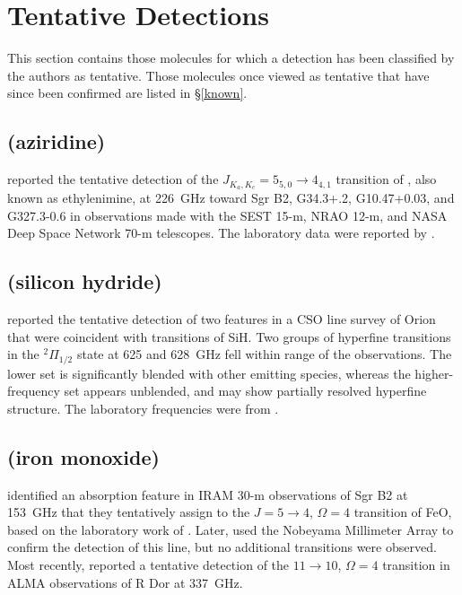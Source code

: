 \documentclass[twocolumn]{aastex631}
\begin{document}

	
\section{Tentative Detections}
\label{tentative}

This section contains those molecules for which a detection has been classified by the authors as tentative.  Those molecules once viewed as tentative that have since been confirmed are listed in \S\ref{known}.

    \subsection{ (aziridine)}
	\label{C2H5N}
	
	\citet{Dickens:2001uc} reported the tentative detection of the $J_{K_a,K_c} = 5_{5,0}\rightarrow4_{4,1}$ transition of , also known as ethylenimine, at 226~GHz toward Sgr B2, G34.3+.2, G10.47+0.03, and G327.3-0.6 in observations made with the SEST 15-m, NRAO 12-m, and NASA Deep Space Network 70-m telescopes.  The laboratory data were reported by \citet{Thorwirth:2000ii}.  
	
	\subsection{ (silicon hydride)}
	\label{SiH}
	
	\citet{Schilke:2001fr} reported the tentative detection of two features in a CSO line survey of Orion that were coincident with transitions of SiH.  Two groups of hyperfine transitions in the $^2\Pi _{1/2}$ state at 625 and 628~GHz fell within range of the observations.  The lower set is significantly blended with other emitting species, whereas the higher-frequency set appears unblended, and may show partially resolved hyperfine structure.  The laboratory frequencies were from \citet{Brown:1985cr}. 
	
	\subsection{ (iron monoxide)}
	\label{FeO}
	
	\citet{Walmsley:2002ud} identified an absorption feature in IRAM 30-m observations of Sgr B2 at 153~GHz that they tentatively assign to the $J = 5\rightarrow4$, $\Omega = 4$ transition of FeO, based on the laboratory work of \citet{Allen:1996te}.  Later, \citet{Furuya:2003jh} used the Nobeyama Millimeter Array to confirm the detection of this line, but no additional transitions were observed.  Most recently, \citet{Decin:2018ju} reported a tentative detection of the $11\rightarrow10$, $\Omega = 4$ transition in ALMA observations of R Dor at 337~GHz.  
	
\end{document}
